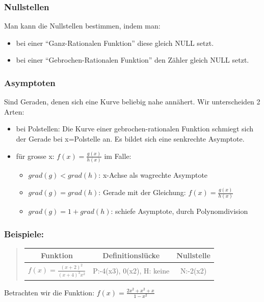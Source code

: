 \subsubsection*{Nullstellen}

Man kann die Nullstellen bestimmen, indem man:
\begin{itemize}
\item bei einer ``Ganz-Rationalen Funktion'' diese gleich NULL setzt.
\item bei einer ``Gebrochen-Rationalen Funktion'' den Zähler gleich NULL
setzt.
\end{itemize}

\subsubsection*{Asymptoten}

Sind Geraden, denen sich eine Kurve beliebig nahe annähert. Wir unterscheiden
2 Arten:
\begin{itemize}
\item bei Polstellen: Die Kurve einer gebrochen-rationalen Funktion schmiegt
sich der Gerade bei x=Polstelle an. Es bildet sich eine senkrechte
Asymptote.
\item für grosse x: $f(x)=\frac{g(x)}{h(x)}$ im Falle:

\begin{itemize}
\item $grad(g)<grad(h)$: x-Achse als wagrechte Asymptote
\item $grad(g)=grad(h)$: Gerade mit der Gleichung: $f(x)=\frac{g(x)}{h(x)}$
\item $grad(g)=1+grad(h)$: schiefe Asymptote, durch Polynomdivision
\end{itemize}
\end{itemize}

\subsubsection*{Beispiele:}
\begin{verse}
\begin{tabular}{|c|c|c|}
\hline 
Funktion & Definitionslücke & Nullstelle\tabularnewline
\hline 
\hline 
$f(x)=\frac{(x+2)^{2}}{(x+4)^{3}x^{2}}$ & P:-4(x3), 0(x2), H: keine & N:-2(x2)\tabularnewline
\hline 
\end{tabular}
\end{verse}


Betrachten wir die Funktion: $f(x)=\frac{2x^{2}+x^{2}+x}{1-x^{2}}$

